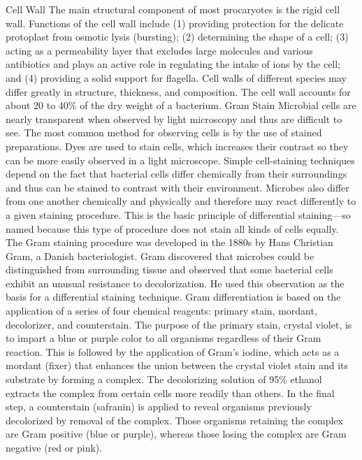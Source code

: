 \documentclass{article}
\begin{document}
Cell Wall The main structural component of most procaryotes is the rigid
cell wall. Functions of the cell wall include (1) providing protection
for the delicate protoplast from osmotic lysis (bursting); (2)
determining the shape of a cell; (3) acting as a permeability layer that
excludes large molecules and various antibiotics and plays an active
role in regulating the intake of ions by the cell; and (4) providing a
solid support for flagella. Cell walls of different species may differ
greatly in structure, thickness, and composition. The cell wall accounts
for about 20 to 40\% of the dry weight of a bacterium. Gram Stain
Microbial cells are nearly transparent when observed by light microscopy
and thus are difficult to see. The most common method for observing
cells is by the use of stained preparations. Dyes are used to stain
cells, which increases their contrast so they can be more easily
observed in a light microscope. Simple cell-staining techniques depend
on the fact that bacterial cells differ chemically from their
surroundings and thus can be stained to contrast with their environment.
Microbes also differ from one another chemically and physically and
therefore may react differently to a given staining procedure. This is
the basic principle of differential staining---so named because this
type of procedure does not stain all kinds of cells equally. The Gram
staining procedure was developed in the 1880s by Hans Christian Gram, a
Danish bacteriologist. Gram discovered that microbes could be
distinguished from surrounding tissue and observed that some bacterial
cells exhibit an unusual resistance to decolorization. He used this
observation as the basis for a differential staining technique. Gram
differentiation is based on the application of a series of four chemical
reagents: primary stain, mordant, decolorizer, and counterstain. The
purpose of the primary stain, crystal violet, is to impart a blue or
purple color to all organisms regardless of their Gram reaction. This is
followed by the application of Gram's iodine, which acts as a mordant
(fixer) that enhances the union between the crystal violet stain and its
substrate by forming a complex. The decolorizing solution of 95\%
ethanol extracts the complex from certain cells more readily than
others. In the final step, a counterstain (safranin) is applied to
reveal organisms previously decolorized by removal of the complex. Those
organisms retaining the complex are Gram positive (blue or purple),
whereas those losing the complex are Gram negative (red or pink).
\end{document}
